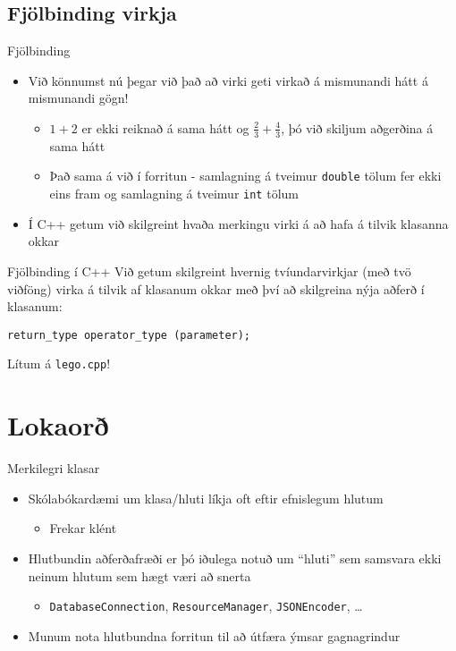 \documentclass[handout]{beamer}
\begin{document}
\subsection{Fjölbinding virkja}

\begin{frame}{Fjölbinding}
\begin{itemize}
 \item Við könnumst nú þegar við það að virki geti virkað á mismunandi hátt á mismunandi gögn!
 \begin{itemize}
  \item $1 + 2$ er ekki reiknað á sama hátt og $\frac{2}{3} + \frac{4}{3}$, þó við skiljum aðgerðina á sama hátt
  \item Það sama á við í forritun - samlagning á tveimur \texttt{double} tölum fer ekki eins fram og samlagning á tveimur \texttt{int} tölum
 \end{itemize}
 \item Í C++ getum við skilgreint hvaða merkingu virki á að hafa á tilvik klasanna okkar
\end{itemize}
\end{frame}

\begin{frame}{Fjölbinding í C++}
Við getum skilgreint hvernig tvíundarvirkjar (með tvö viðföng) virka á tilvik af klasanum okkar með því að skilgreina nýja aðferð í klasanum:
\begin{center}
\texttt{return\_type operator\_type (parameter);}
\end{center}
Lítum á \texttt{lego.cpp}!
\end{frame}

\section{Lokaorð}

\begin{frame}{Merkilegri klasar}
\begin{itemize}
 \item Skólabókardæmi um klasa/hluti líkja oft eftir efnislegum hlutum
 \begin{itemize}
  \item Frekar klént
 \end{itemize}
 \item Hlutbundin aðferðafræði er þó iðulega notuð um ``hluti'' sem samsvara ekki neinum hlutum sem hægt væri að snerta
 \begin{itemize}
  \item \texttt{DatabaseConnection}, \texttt{ResourceManager}, \texttt{JSONEncoder}, \ldots
 \end{itemize}
 \item Munum nota hlutbundna forritun til að útfæra ýmsar gagnagrindur
\end{itemize}
\end{frame}
\end{document}
